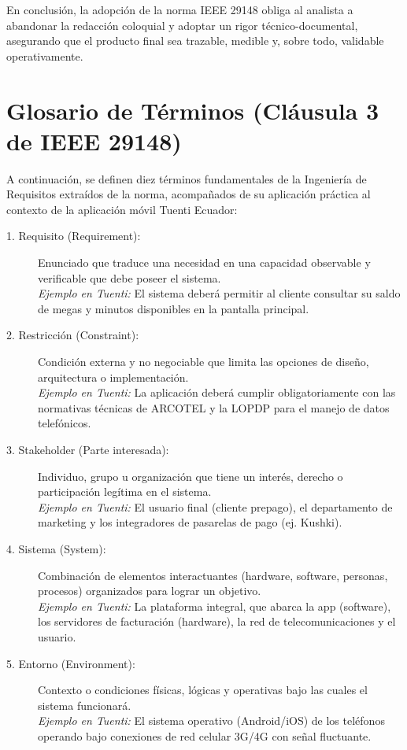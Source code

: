 \documentclass[12pt,a4paper]{article}
\begin{document}
En conclusión, la adopción de la norma IEEE 29148 obliga al analista a abandonar la redacción coloquial y adoptar un rigor técnico-documental, asegurando que el producto final sea trazable, medible y, sobre todo, validable operativamente.

\section{Glosario de Términos (Cláusula 3 de IEEE 29148)}
A continuación, se definen diez términos fundamentales de la Ingeniería de Requisitos extraídos de la norma, acompañados de su aplicación práctica al contexto de la aplicación móvil Tuenti Ecuador:

\begin{description}
    \item[1. Requisito (Requirement):] Enunciado que traduce una necesidad en una capacidad observable y verificable que debe poseer el sistema. \\
    \textit{Ejemplo en Tuenti:} El sistema deberá permitir al cliente consultar su saldo de megas y minutos disponibles en la pantalla principal.

    \item[2. Restricción (Constraint):] Condición externa y no negociable que limita las opciones de diseño, arquitectura o implementación. \\
    \textit{Ejemplo en Tuenti:} La aplicación deberá cumplir obligatoriamente con las normativas técnicas de ARCOTEL y la LOPDP para el manejo de datos telefónicos.

    \item[3. Stakeholder (Parte interesada):] Individuo, grupo u organización que tiene un interés, derecho o participación legítima en el sistema. \\
    \textit{Ejemplo en Tuenti:} El usuario final (cliente prepago), el departamento de marketing y los integradores de pasarelas de pago (ej. Kushki).

    \item[4. Sistema (System):] Combinación de elementos interactuantes (hardware, software, personas, procesos) organizados para lograr un objetivo. \\
    \textit{Ejemplo en Tuenti:} La plataforma integral, que abarca la app (software), los servidores de facturación (hardware), la red de telecomunicaciones y el usuario.

    \item[5. Entorno (Environment):] Contexto o condiciones físicas, lógicas y operativas bajo las cuales el sistema funcionará. \\
    \textit{Ejemplo en Tuenti:} El sistema operativo (Android/iOS) de los teléfonos operando bajo conexiones de red celular 3G/4G con señal fluctuante.


\end{description}
\end{document}
